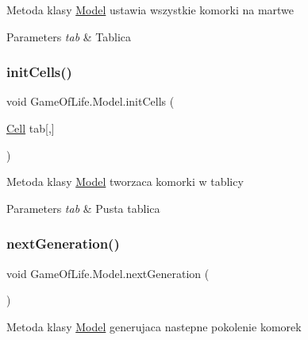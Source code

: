 Metoda klasy \mbox{\hyperlink{class_game_of_life_1_1_model}{Model}} ustawia wszystkie komorki na martwe 


\begin{DoxyParams}{Parameters}
{\em tab} & Tablica\\
\hline
\end{DoxyParams}
\mbox{\label{class_game_of_life_1_1_model_af96487f644682e8fd22a29a0670b874e}} 
\subsubsection{\texorpdfstring{initCells()}{initCells()}}
{\footnotesize\ttfamily void Game\+Of\+Life.\+Model.\+init\+Cells (\begin{DoxyParamCaption}\item[{\mbox{\hyperlink{class_game_of_life_1_1_cell}{Cell}}}]{tab\mbox{[},\mbox{]} }\end{DoxyParamCaption})\hspace{0.3cm}{\ttfamily [inline]}}



Metoda klasy \mbox{\hyperlink{class_game_of_life_1_1_model}{Model}} tworzaca komorki w tablicy 


\begin{DoxyParams}{Parameters}
{\em tab} & Pusta tablica\\
\hline
\end{DoxyParams}
\mbox{\label{class_game_of_life_1_1_model_adcbc7e10087aa7beeebd38c874c48d1f}} 
\subsubsection{\texorpdfstring{nextGeneration()}{nextGeneration()}}
{\footnotesize\ttfamily void Game\+Of\+Life.\+Model.\+next\+Generation (\begin{DoxyParamCaption}{ }\end{DoxyParamCaption})\hspace{0.3cm}{\ttfamily [inline]}}



Metoda klasy \mbox{\hyperlink{class_game_of_life_1_1_model}{Model}} generujaca nastepne pokolenie komorek 

